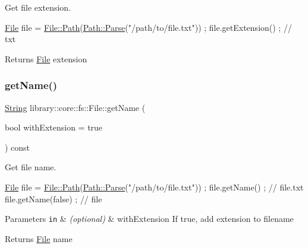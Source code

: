 Get file extension. 


\begin{DoxyCode}
\hyperlink{classlibrary_1_1core_1_1fs_1_1_file_a6f3f0d79545ac9984c6f49432f0c6c39}{File} file = \hyperlink{classlibrary_1_1core_1_1fs_1_1_file_a72d6cdf8bb7e299889c6149e2b8a6cc7}{File::Path}(\hyperlink{classlibrary_1_1core_1_1fs_1_1_path_a6ba644b6609507e724c217bf2020f5ae}{Path::Parse}(\textcolor{stringliteral}{"/path/to/file.txt"})) ;
file.getExtension() ; \textcolor{comment}{// txt}
\end{DoxyCode}


\begin{DoxyReturn}{Returns}
\hyperlink{classlibrary_1_1core_1_1fs_1_1_file}{File} extension 
\end{DoxyReturn}
\mbox{\label{classlibrary_1_1core_1_1fs_1_1_file_ac8ecef1fd249eaf2ab6d7141131c0424}} 
\subsubsection{\texorpdfstring{get\+Name()}{getName()}}
{\footnotesize\ttfamily \hyperlink{classlibrary_1_1core_1_1types_1_1_string}{String} library\+::core\+::fs\+::\+File\+::get\+Name (\begin{DoxyParamCaption}\item[{bool}]{with\+Extension = {\ttfamily true} }\end{DoxyParamCaption}) const}



Get file name. 


\begin{DoxyCode}
\hyperlink{classlibrary_1_1core_1_1fs_1_1_file_a6f3f0d79545ac9984c6f49432f0c6c39}{File} file = \hyperlink{classlibrary_1_1core_1_1fs_1_1_file_a72d6cdf8bb7e299889c6149e2b8a6cc7}{File::Path}(\hyperlink{classlibrary_1_1core_1_1fs_1_1_path_a6ba644b6609507e724c217bf2020f5ae}{Path::Parse}(\textcolor{stringliteral}{"/path/to/file.txt"})) ;
file.getName() ; \textcolor{comment}{// file.txt}
file.getName(\textcolor{keyword}{false}) ; \textcolor{comment}{// file}
\end{DoxyCode}



\begin{DoxyParams}[1]{Parameters}
\mbox{\tt in}  & {\em (optional)} & with\+Extension If true, add extension to filename \\
\hline
\end{DoxyParams}
\begin{DoxyReturn}{Returns}
\hyperlink{classlibrary_1_1core_1_1fs_1_1_file}{File} name 
\end{DoxyReturn}
\mbox{\label{classlibrary_1_1core_1_1fs_1_1_file_a8eb74097f9bdc9d3c626fe4924bf405e}} 
